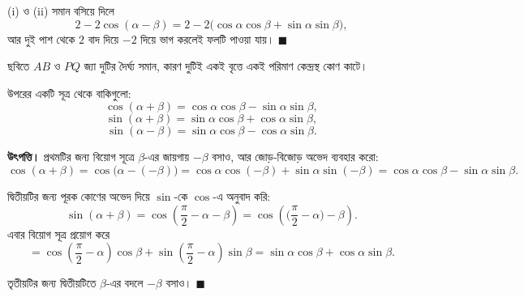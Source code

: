 \documentclass[11pt]{article}
\begin{document}
(i) ও (ii) সমান বসিয়ে দিলে
\[
  2 - 2\cos(\alpha-\beta) = 2 - 2\big( \cos\alpha\cos\beta + \sin\alpha\sin\beta \big),
\]
আর দুই পাশ থেকে $2$ বাদ দিয়ে $-2$ দিয়ে ভাগ করলেই ফলটি পাওয়া যায়।
$\blacksquare$

\begin{center}
\end{center}

\noindent
ছবিতে $AB$ ও $PQ$ জ্যা দুটির দৈর্ঘ্য সমান, কারণ দুটিই একই বৃত্তে একই পরিমাণ
কেন্দ্রস্থ কোণ কাটে।

\begin{idea}[বাকি তিনটি]
উপরের একটি সূত্র থেকে বাকিগুলো:
\[
  \cos(\alpha + \beta) = \cos\alpha\cos\beta - \sin\alpha\sin\beta ,
\]
\[
  \sin(\alpha + \beta) = \sin\alpha\cos\beta + \cos\alpha\sin\beta ,
\]
\[
  \sin(\alpha - \beta) = \sin\alpha\cos\beta - \cos\alpha\sin\beta .
\]
\end{idea}

\noindent
\textbf{উৎপত্তি।} প্রথমটির জন্য বিয়োগ সূত্রে $\beta$-এর জায়গায় $-\beta$ বসাও,
আর জোড়-বিজোড় অভেদ ব্যবহার করো:
\[
  \cos(\alpha + \beta) = \cos\big( \alpha - (-\beta) \big)
  = \cos\alpha\cos(-\beta) + \sin\alpha\sin(-\beta)
  = \cos\alpha\cos\beta - \sin\alpha\sin\beta .
\]

দ্বিতীয়টির জন্য পূরক কোণের অভেদ দিয়ে $\sin$-কে $\cos$-এ অনুবাদ করি:
\[
  \sin(\alpha+\beta) = \cos\!\left( \frac{\pi}{2} - \alpha - \beta \right)
  = \cos\!\left( \Big( \frac{\pi}{2} - \alpha \Big) - \beta \right) .
\]
এবার বিয়োগ সূত্র প্রয়োগ করে
\[
  = \cos\!\left( \frac{\pi}{2} - \alpha \right)\cos\beta
  + \sin\!\left( \frac{\pi}{2} - \alpha \right)\sin\beta
  = \sin\alpha\cos\beta + \cos\alpha\sin\beta .
\]

তৃতীয়টির জন্য দ্বিতীয়টিতে $\beta$-এর বদলে $-\beta$ বসাও। $\blacksquare$
\end{document}
